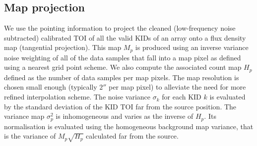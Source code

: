 \subsection{Map projection}
\label{se:map_projection}
We use the pointing information to project the cleaned (low-frequency
noise subtracted) calibrated TOI of all the valid KIDs of an array
onto a flux density map (tangential projection). This map $M_p$ is produced using an inverse
variance noise weighting of all of the data samples that fall into a map
pixel as defined using a nearest grid point scheme. We also compute
the associated count map $H_p$ defined as the number of data samples
per map pixels. The map resolution
is chosen small enough (typically $2''$ per map pixel) to alleviate
the need for more refined interpolation scheme. The noise variance
$\sigma_k$ for each KID $k$ is evaluated by the standard deviation of the
KID TOI far from the source position. 
{\lp The variance map $\sigma_p^2$ is inhomogeneous and varies as the
inverse of $H_p$. Its normalisation is evaluated using the
homogeneous background map variance, that is the
variance of $M_p\sqrt{H_p}$ calculated far from the source.}


